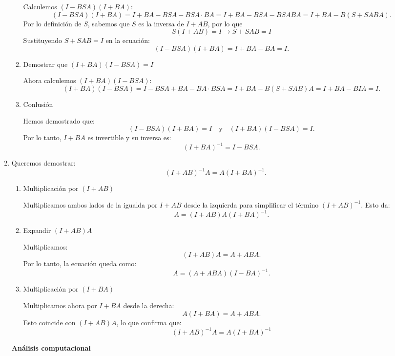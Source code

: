 \begin{enumerate}[label=\color{red}\textbf{\arabic*)}]
\begin{enumerate}[label=Paso \arabic*:]
            Calculemos $(I-BSA)(I+BA)$:  \[
                (I-BSA)(I+BA)=I+BA-BSA-BSA\cdot BA=I+BA-BSA-BSABA=I+BA-B(S+SABA).
            \] 
            Por lo definición de $S$, sabemos que $S$ es la inversa de $I+AB$, por lo que  \[
            S(I+AB)=I\longrightarrow S+SAB=I
            \] 
            Sustituyendo $S+SAB=I$ en la ecuación: \[
                (I-BSA)(I+BA)=I+BA-BA=I.
            \] 
        \item Demostrar que $(I+BA)(I-BSA)=I$

            Ahora calculemos  $(I+BA)(I-BSA)$:  \[
                (I+BA)(I-BSA)=I-BSA+BA-BA\cdot BSA=I+BA-B(S+SAB)A=I+BA-BIA=I.
            \] 
        \item Conlusión 

            Hemos demostrado que: \[
                (I-BSA)(I+BA)=I\quad \text{y}\quad(I+BA)(I-BSA)=I.
            \] 
            Por lo tanto, $I+BA$ es invertible y su inversa es:  \[
                (I+BA)^{-1}=I-BSA.
            \] 
    \end{enumerate}
\item {}

Queremos demostrar: \[
    (I+AB)^{-1}A=A(I+BA)^{-1}.
\] 
\begin{enumerate}[label=Paso \arabic*:]
    \item Multiplicación por $(I+AB)$

        Multiplicamos ambos lados de la igualda por  $I+AB$ desde la izquierda para simplificar el término $(I+AB)^{-1}$. Esto da: \[
        A=(I+AB)A(I+BA)^{-1}.
        \] 
    \item Expandir $(I+AB)A$

        Multiplicamos:  \[
        (I+AB)A=A+ABA.
        \] 
        Por lo tanto, la ecuación queda como: \[
        A=(A+ABA)(I-BA)^{-1}.
        \] 
    \item Multiplicación por $(I+BA)$

        Multiplicamos ahora por  $I+BA$ desde la derecha: \[
        A(I+BA)=A+ABA.
        \] 
        Esto coincide con $(I+AB)A$, lo que confirma que:  \[
            (I+AB)^{-1}A=A(I+BA)^{-1}
        \] 
\end{enumerate}
\textbf{Análisis computacional}


\end{enumerate}

